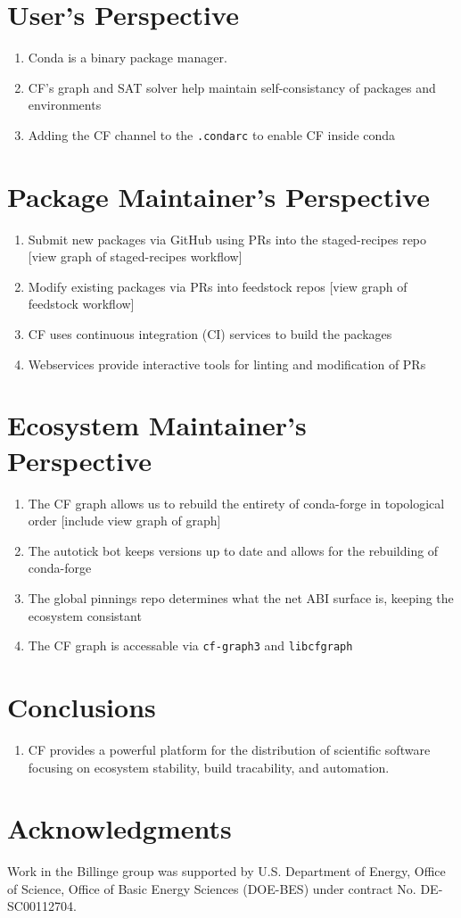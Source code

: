 \documentclass[fleqn,10pt,lineno]{wlpeerj} %
\begin{document}
\section*{User's Perspective}
\begin{enumerate}
\item Conda is a binary package manager.
\item CF's graph and SAT solver help maintain self-consistancy of
packages and environments
\item Adding the CF channel to the \texttt{.condarc} to enable CF
inside conda
\end{enumerate}

\section*{Package Maintainer's Perspective}
\begin{enumerate}
\item Submit new packages via GitHub using PRs into the staged-recipes repo 
[view graph of staged-recipes workflow]
\item Modify existing packages via PRs into feedstock repos [view graph of 
feedstock workflow]
\item CF uses continuous integration (CI) services to build the packages
\item Webservices provide interactive tools for linting and modification of PRs
\end{enumerate}

\section*{Ecosystem Maintainer's Perspective}
\begin{enumerate}
\item The CF graph allows us to rebuild the entirety of conda-forge in 
topological order [include view graph of graph]
\item The autotick bot keeps versions up to date and allows for the 
rebuilding of conda-forge
\item The global pinnings repo determines what the net ABI surface is, 
keeping the ecosystem consistant
\item The CF graph is accessable via \texttt{cf-graph3} and \texttt{libcfgraph}
\end{enumerate}


\section*{Conclusions}
\begin{enumerate}
\item CF provides a powerful platform for the distribution of scientific 
software focusing on ecosystem stability, build tracability, and automation.
\end{enumerate}


\section*{Acknowledgments}

Work in the Billinge group was supported by U.S. Department of Energy,
Office of Science, Office of Basic Energy Sciences (DOE-BES) under contract
No. DE-SC00112704.


\end{document}
